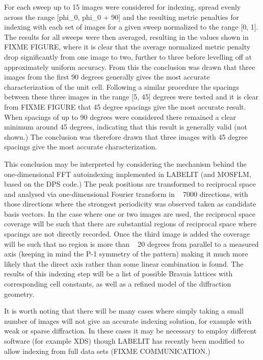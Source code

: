 For each sweep up to 15 images were considered for indexing, spread evenly across the range [phi_0, phi_0 + 90] and the resulting metric penalties for indexing with each set of images for a given sweep normalized to the range [0, 1]. The results for all sweeps were then averaged, resulting in the values shown in FIXME FIGURE, where it is clear that the average normalized metric penalty drop significantly from one image to two, further to three before levelling off at approximately uniform accuracy. From this the conclusion was drawn that three images from the first 90 degrees generally gives the most accurate characterization of the unit cell. Following a similar procedure the spacings between these three images in the range [5, 45] degrees were tested and it is clear from FIXME FIGURE that 45 degree spacings give the most accurate result. When spacings of up to 90 degrees were considered there remained a clear minimum around 45 degrees, indicating that this result is generally valid (not shown.) The conclusion was therefore drawn that three images with 45 degree spacings give the most accurate characterization. 

This conclusion may be interpreted by considering the mechanism behind the one-dimensional FFT autoindexing implemented in LABELIT (and MOSFLM, based on the DPS code.) The peak positions are transformed to reciprocal space and analysed via one-dimensional Fourier transform in ~ 7000 directions, with those directions where the strongest periodicity was observed taken as candidate basis vectors. In the case where one or two images are used, the reciprocal space coverage will be such that there are substantial regions of reciprocal space where spacings are not directly recorded. Once the third image is added the coverage will be such that no region is more than ~ 20 degrees from parallel to a measured axis (keeping in mind the P-1 symmetry of the pattern) making it much more likely that the direct axis rather than some linear combination is found. The results of this indexing step will be a list of possible Bravais lattices with corresponding cell constants, as well as a refined model of the diffraction geometry.

It is worth noting that there will be many cases where simply taking a small number of images will not give an accurate indexing solution, for example with weak or sparse diffraction. In these cases it may be necessary to employ different software (for example XDS) though LABELIT has recently been modified to allow indexing from full data sets (FIXME COMMUNICATION.)

